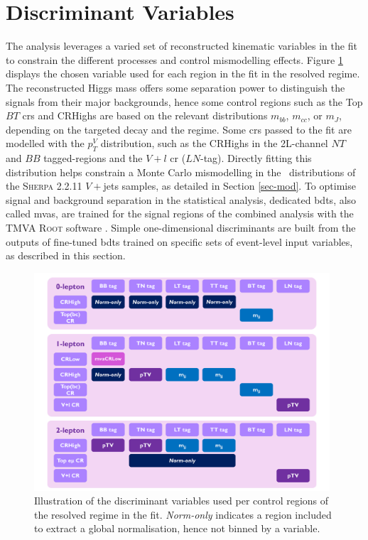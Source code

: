 \section{Discriminant Variables}\label{sec-vh-disc}
The analysis leverages a varied set of reconstructed kinematic variables in the fit to constrain the different processes and control mismodelling effects. Figure \ref{fig:variablesControlReg} displays the chosen variable used for each region in the fit in the resolved regime. The reconstructed Higgs mass offers some separation power to distinguish the signals from their major backgrounds, hence some control regions such as the Top $BT$ \glspl{cr} and CRHighs are based on the relevant distributions $m_{bb}$, $m_{cc}$, or $m_J$, depending on the targeted decay and the regime. Some \glspl{cr} passed to the fit are modelled with the $p_T^V$ distribution, such as the CRHighs in the 2L-channel $NT$ and $BB$ tagged-regions and the $V+l$ \gls{cr} ($LN$-tag). Directly fitting this distribution helps constrain a Monte Carlo mismodelling in the \ptv\ distributions of the \textsc{Sherpa} 2.2.11 $V+$jets samples, as detailed in Section \ref{sec-mod}. To optimise signal and background separation in the statistical analysis, dedicated \glspl{bdt}, also called \glspl{mva}, are trained for the signal regions of the combined analysis with the \textsc{TMVA} \textsc{Root} software \cite{Therhaag:2011jh}. Simple one-dimensional discriminants are built from the outputs of fine-tuned \glspl{bdt} trained on specific sets of event-level input variables, as described in this section.

\begin{figure}[h!]
  \center
  \includegraphics[width=0.98\textwidth]{Images/VH/Discriminants/Variables.pdf}
  \caption{Illustration of the discriminant variables used per control regions of the resolved regime in the fit. \textit{Norm-only} indicates a region included to extract a global normalisation, hence not binned by a variable.}
  \label{fig:variablesControlReg}
\end{figure}

